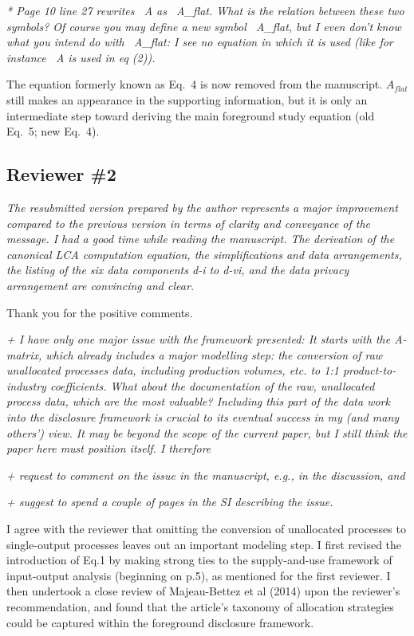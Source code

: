 \documentclass[11pt,letterpaper]{article}
\begin{document}
\emph{  * Page 10 line 27 rewrites ~A as ~A\_flat. What is the relation between these two symbols? Of course you may define a new symbol ~A\_flat, but I even don't know what you intend do with ~A\_flat: I see no equation in which it is used (like for instance ~A is used in eq (2)).}

The equation formerly known as Eq.~4 is now removed from the manuscript.  $A_{flat}$ still makes an appearance in the supporting information, but it is only an intermediate step toward deriving the main foreground study equation (old Eq.~5; new Eq.~4).

\subsection*{Reviewer \#2}

\emph{The resubmitted version prepared by the author represents a major improvement compared to the previous version in terms of clarity and conveyance of the message. I had a good time while reading the manuscript.
  The derivation of the canonical LCA computation equation, the simplifications and data arrangements, the listing of the six data components d-i to d-vi, and the data privacy arrangement are convincing and clear.}

Thank you for the positive comments.

\emph{+ I have only one major issue with the framework presented: It starts with the A-matrix, which already includes a major modelling step: the conversion of raw unallocated processes data, including production volumes, etc. to 1:1 product-to-industry coefficients. What about the documentation of the raw, unallocated process data, which are the most valuable?
  Including this part of the data work into the disclosure framework is crucial to its eventual success in my (and many others’) view. It may be beyond the scope of the current paper, but I still think the paper here must position itself. I therefore}

\emph{+ request to comment on the issue in the manuscript, e.g., in the discussion, and}

\emph{+ suggest to spend a couple of pages in the SI describing the issue.}

I agree with the reviewer that omitting the conversion of unallocated processes to single-output processes leaves out an important modeling step.  I first revised the introduction of Eq.1 by making strong ties to the supply-and-use framework of input-output analysis (beginning on p.5), as mentioned for the first reviewer.  I then undertook a close review of Majeau-Bettez et al (2014) upon the reviewer's recommendation, and found that the article's taxonomy of allocation strategies could be captured within the foreground disclosure framework.  
\end{document}
